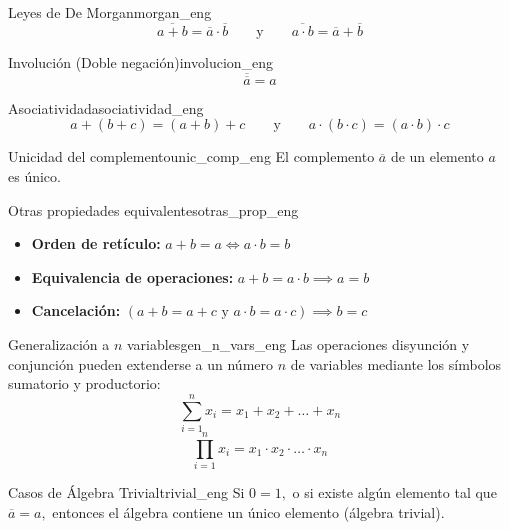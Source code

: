 \setcounter{tcb@cnt@teorema}{11}
\begin{teorema}{Leyes de De Morgan}{morgan_eng}
\[ \overline{a + b} = \overline{a} \cdot \overline{b} \qquad \text{y} \qquad \overline{a \cdot b} = \overline{a} + \overline{b} \]
\end{teorema}

\setcounter{tcb@cnt@teorema}{10}
\begin{teorema}{Involución (Doble negación)}{involucion_eng}
\[ \overline{\overline{a}} = a \]
\end{teorema}

\setcounter{tcb@cnt@teorema}{12}
\begin{teorema}{Asociatividad}{asociatividad_eng}
\[ a + (b + c) = (a + b) + c \qquad \text{y} \qquad a \cdot (b \cdot c) = (a \cdot b) \cdot c \]
\end{teorema}

\setcounter{tcb@cnt@teorema}{9}
\begin{teorema}{Unicidad del complemento}{unic_comp_eng}
El complemento $\overline{a}$ de un elemento $a$ es único.
\end{teorema}

\setcounter{tcb@cnt@teorema}{6}
\begin{teorema}{Otras propiedades equivalentes}{otras_prop_eng}
\begin{itemize}
    \item \textbf{Orden de retículo:} $a + b = a \iff a \cdot b = b$
    \item \textbf{Equivalencia de operaciones:} $a + b = a \cdot b \implies a = b$
    \item \textbf{Cancelación:} $(a + b = a + c \text{ y } a \cdot b = a \cdot c) \implies b = c$
\end{itemize}
\end{teorema}

\setcounter{tcb@cnt@definicion}{0}
\begin{definicion}{Generalización a $n$ variables}{gen_n_vars_eng}
Las operaciones disyunción y conjunción pueden extenderse a un número $n$ de variables mediante los símbolos sumatorio y productorio:
\[ \sum_{i=1}^{n} x_i = x_1 + x_2 + \dots + x_n \]
\[ \prod_{i=1}^{n} x_i = x_1 \cdot x_2 \cdot \dots \cdot x_n \]
\end{definicion}

\setcounter{tcb@cnt@teorema}{3}
\begin{teorema}{Casos de Álgebra Trivial}{trivial_eng}
Si $0 = 1,$ o si existe algún elemento tal que $\overline{a} = a,$ entonces el álgebra contiene un único elemento (álgebra trivial).
\end{teorema}


